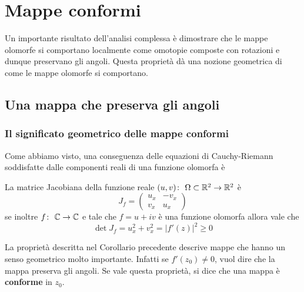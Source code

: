 \chapter{Mappe conformi}
Un importante risultato dell'analisi complessa è dimostrare che le mappe olomorfe si comportano localmente come omotopie composte con rotazioni e dunque preservano gli angoli. Questa proprietà dà una nozione geometrica di come le mappe olomorfe si comportano. 

\newpage
\section{Una mappa che preserva gli angoli}
\subsection{\textcolor{AnComp}{\textbf{Il significato geometrico delle mappe conformi}}}

Come abbiamo visto, una conseguenza delle equazioni di Cauchy-Riemann soddisfatte dalle componenti
reali di una funzione olomorfa è 

\begin{corollary}
  La matrice Jacobiana della funzione reale $(u,v) \colon\ \Omega \subset
  \mathbb{R}^2 \rightarrow \mathbb{R}^2$ è
  \begin{equation*}
    J_f = \left(\begin{array}{cc} 
        u_x & -v_x\\
        v_x & u_x
    \end{array}\right) 
  \end{equation*}
  se inoltre $f \colon\ \mathbb{C} \rightarrow \mathbb{C}$ e tale che $f = u + iv$ è una funzione
  olomorfa allora vale che
  \begin{equation*}
    \det J_f = u^2_x + v^2_x = |f'(z)|^2 \ge 0 
  \end{equation*}
\end{corollary}

\begin{remark}
  La proprietà descritta nel Corollario precedente descrive mappe che hanno un 
  senso geometrico molto importante. Infatti se $f'(z_0) \neq 0$, vuol dire che
  la mappa preserva gli angoli. Se vale questa proprietà, si dice che una mappa
  è \textbf{conforme} in $z_0$.
  \label{rmk:conforme_intuizione}
\end{remark}

